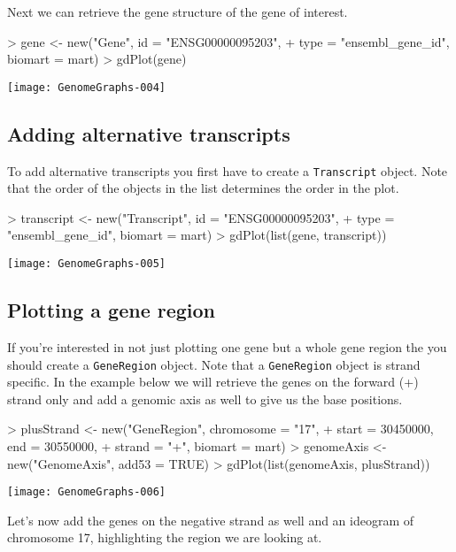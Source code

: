 \documentclass[11pt]{article}
\newcommand{\Robject}[1]{{\texttt{#1}}}
\begin{document}
Next we can retrieve the gene structure of the gene of interest.

\begin{Schunk}
\begin{Sinput}
> gene <- new("Gene", id = "ENSG00000095203", 
+     type = "ensembl_gene_id", biomart = mart)
> gdPlot(gene)
\end{Sinput}
\end{Schunk}
\texttt{[image: GenomeGraphs-004]}

\subsection{Adding alternative transcripts}

To add alternative transcripts you first have to create a \Robject{Transcript} object.
Note that the order of the objects in the list determines the order in the plot.
\begin{Schunk}
\begin{Sinput}
> transcript <- new("Transcript", id = "ENSG00000095203", 
+     type = "ensembl_gene_id", biomart = mart)
> gdPlot(list(gene, transcript))
\end{Sinput}
\end{Schunk}
\texttt{[image: GenomeGraphs-005]}

\subsection{Plotting a gene region}

If you're interested in not just plotting one gene but a whole gene
region the you should create a \Robject{GeneRegion} object.  Note that
a \Robject{GeneRegion} object is strand specific.  In the example
below we will retrieve the genes on the forward (+) strand only and
add a genomic axis as well to give us the base positions.

\begin{Schunk}
\begin{Sinput}
> plusStrand <- new("GeneRegion", chromosome = "17", 
+     start = 30450000, end = 30550000, 
+     strand = "+", biomart = mart)
> genomeAxis <- new("GenomeAxis", add53 = TRUE)
> gdPlot(list(genomeAxis, plusStrand))
\end{Sinput}
\end{Schunk}
\texttt{[image: GenomeGraphs-006]}

Let's now add the genes on the negative strand as well and an ideogram
of chromosome 17, highlighting the region we are looking at.
\end{document}
